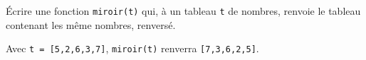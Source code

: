 \exer{}
\setcounter{numques}{0}

\question \'Ecrire une fonction \texttt{miroir(t)} qui, à un tableau \texttt{t} de nombres, renvoie le tableau contenant les même nombres, renversé.

\begin{exemple}
  Avec  \texttt{t = [5,2,6,3,7]}, \texttt{miroir(t)} renverra \texttt{[7,3,6,2,5]}.
\end{exemple}